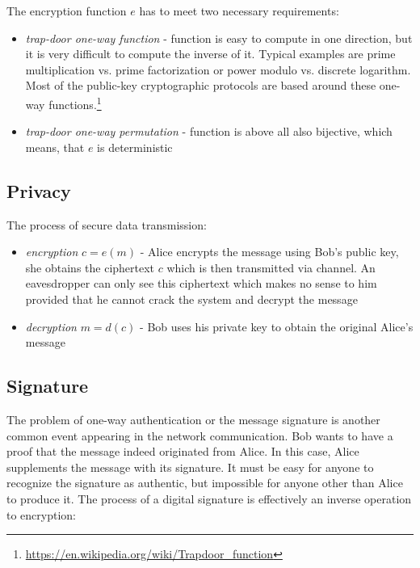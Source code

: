 \noindent
The encryption function $e$ has to meet two necessary requirements:

\begin{itemize}

\item \textit{trap-door one-way function} - function is easy to compute in one direction, but it is very difficult to compute the inverse of it. Typical examples are prime multiplication vs. prime factorization or power modulo vs. discrete logarithm. Most of the public-key cryptographic protocols are based around these one-way functions.\footnote{\url{https://en.wikipedia.org/wiki/Trapdoor_function}}

\item \textit{trap-door one-way permutation} - function is above all also bijective, which means, that $e$ is deterministic 

\end{itemize}

\subsection*{Privacy}

The process of secure data transmission:

\begin{itemize}

\item \textit{encryption} $c = e(m)$ - Alice encrypts the message using Bob's public key, she obtains the ciphertext $c$ which is then transmitted via channel. An eavesdropper can only see this ciphertext which makes no sense to him provided that he cannot crack the system and decrypt the message

\item \textit{decryption} $m = d(c)$ - Bob uses his private key to obtain the original Alice's message

\end{itemize}

\subsection*{Signature}

The problem of one-way authentication or the message signature is another common event appearing in the network communication. Bob wants to have a proof that the message indeed originated from Alice. In this case, Alice supplements the message with its signature. It must be easy for anyone to recognize the signature as authentic, but impossible for anyone other than Alice to produce it. The process of a digital signature is effectively an inverse operation to encryption:

